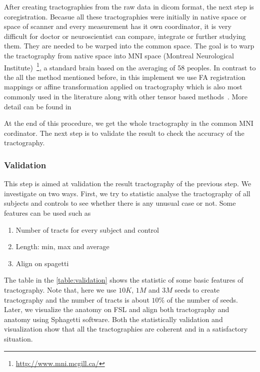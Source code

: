 After creating tractographies from the raw data in dicom format, the next step is coregistration. Becasue all these tractographies were initially in native space or space of scanner and every measurement has it own coordinator, it is very difficult for doctor or neuroscientist can compare, integrate or further studying them. They are needed to be warped into the common space. The goal is to warp the tractography from native space into MNI space (Montreal Neurological Institute)~\footnote{\url{http://www.mni.mcgill.ca/}}, a standard brain based on the averaging of 58 peoples. In contrast to the all the method mentioned before, in this implement we use FA registration mappings or affine transformation applied on tractography which is also most commonly used in the literature along with other tensor based methods~\cite{goh2006algebraic}. More detail can be found in \cite{bao2012dmri}

At the end of this procedure, we get the whole tractography in the common MNI cordinator. The next step is to validate the result to check the accuracy of the tractography.

\subsubsection{Validation}
This step is aimed at validation the result tractography of the previous step. We investigate on two ways. First, we try to statistic analyse the tractography of all subjects and controls to see whether there is any unusual case or not. Some features can be used such as

\begin{enumerate}
	\item Number of tracts for every subject and control
	\item Length: min, max and average
	\item Align on spagetti
\end{enumerate}

%

\label{table:validation}

%
The table in the \ref{table:validation} shows the statistic of some basic features of tractography. Note that, here we use $10K$, $1M$ and $3M$ seeds to create tractography and the number of tracts is about $10\%$ of the number of seeds. Later, we visualize the anatomy on FSL and align both tractography and anatomy using Sphagetti software. Both the statistically validation and visualization show that all the tractographies are coherent and in a satisfactory situation. %
